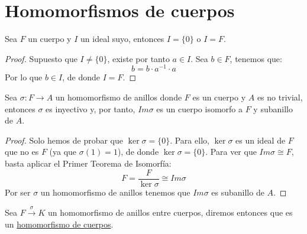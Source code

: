 \section{Homomorfismos de cuerpos}

\begin{lema}
    Sea $F$ un cuerpo y $I$ un ideal suyo, entonces $I = \{0\}$ o $I = F$.
    \begin{proof}
        Supuesto que $I\neq \{0\}$, existe por tanto $a\in I$. Sea $b\in F$, tenemos que:
        \begin{equation*}
            b = b\cdot a^{-1}\cdot a
        \end{equation*}
        Por lo que $b\in I$, de donde $I = F$.
    \end{proof}
\end{lema}

\begin{lema}
    Sea $\sigma:F\to A$ un homomorfismo de anillos donde $F$ es un cuerpo y $A$ es no trivial, entonces $\sigma$ es inyectivo y, por tanto, $Im \sigma$ es un cuerpo isomorfo a $F$ y subanillo de $A$.
    \begin{proof}
        Solo hemos de probar que $\ker \sigma = \{0\}$. Para ello, $\ker \sigma$ es un ideal de $F$ que no es $F$ (ya que $\sigma(1) = 1$), de donde $\ker \sigma = \{0\}$. Para ver que $Im \sigma\cong F$, basta aplicar el Primer Teorema de Isomorfía:
        \begin{equation*}
            F = \dfrac{F}{\ker \sigma} \cong Im \sigma
        \end{equation*}
        Por ser $\sigma$ un homomorfismo de anillos tenemos que $Im\sigma$ es subanillo de $A$.
    \end{proof}
\end{lema}

\begin{definicion}
    Sea $F\stackrel{\sigma}{\to} K$ un homomorfismo de anillos entre cuerpos, diremos entonces que es un \underline{homomorfismo de cuerpos}.
\end{definicion}

